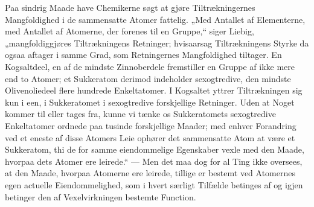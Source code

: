 \documentclass[12pt,a4paper]{book}
\begin{document}
Paa sindrig Maade have Chemikerne søgt at gjøre
Tiltrækningernes Mangfoldighed i de sammensatte Atomer
fattelig. „Med Antallet af Elementerne, med Antallet af
Atomerne, der forenes til en Gruppe,“ siger Liebig,
„mangfoldiggjøres Tiltrækningens Retninger; hvisaarsag Tiltrækningens
Styrke da ogsaa aftager i samme Grad, som Retningernes
Mangfoldighed tiltager. En Kogsaltdeel, en af de mindste
Zinnoberdele fremstiller en Gruppe af ikke mere end to
Atomer; et Sukkeratom derimod indeholder sexogtredive, den
mindste Olivenoliedeel flere hundrede Enkeltatomer. I
Kogsaltet yttrer Tiltrækningen sig kun i een, i Sukkeratomet i
sexogtredive forskjellige Retninger. Uden at Noget kommer
til eller tages fra, kunne vi tænke os Sukkeratomets
sexogtredive Enkeltatomer ordnede paa tusinde forskjellige Maader;
med enhver Forandring ved et eneste af disse Atomers Leie
ophører det sammensatte Atom at være et Sukkeratom, thi
de for samme eiendommelige Egenskaber vexle med den Maade,
hvorpaa dets Atomer ere leirede.“ --- Men det maa dog for
al Ting ikke oversees, at den Maade, hvorpaa Atomerne ere
leirede, tillige er bestemt ved Atomernes egen actuelle
Eiendommelighed, som i hvert særligt Tilfælde betinges af og
igjen betinger den af Vexelvirkningen bestemte Function.
\end{document}
